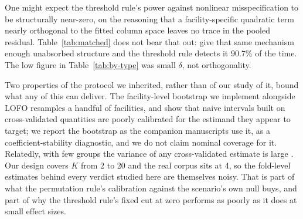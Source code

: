 \documentclass[journal=dce]{CUP-JNL-DTM}%
\begin{document}
One might expect the threshold rule's power against nonlinear misspecification to be structurally near-zero, on the reasoning that a facility-specific quadratic term nearly orthogonal to the fitted column space leaves no trace in the pooled residual. Table~\ref{tab:matched} does not bear that out: give that same mechanism enough unabsorbed structure and the threshold rule detects it 90.7\% of the time. The low figure in Table~\ref{tab:by-type} was small $\delta$, not orthogonality.

Two properties of the protocol we inherited, rather than of our study of it, bound what any of this can deliver. The facility-level bootstrap we implement alongside LOFO resamples a handful of facilities, and \citet{bates2024cross} show that naive intervals built on cross-validated quantities are poorly calibrated for the estimand they appear to target; we report the bootstrap as the companion manuscripts use it, as a coefficient-stability diagnostic, and we do not claim nominal coverage for it. Relatedly, with few groups the variance of any cross-validated estimate is large \citep{varoquaux2018cross}. Our design covers $K$ from 2 to 20 and the real corpus sits at 4, so the fold-level estimates behind every verdict studied here are themselves noisy. That is part of what the permutation rule's calibration against the scenario's own null buys, and part of why the threshold rule's fixed cut at zero performs as poorly as it does at small effect sizes.
\end{document}

